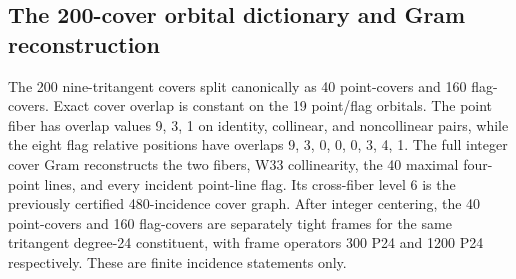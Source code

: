 \subsection{The 200-cover orbital dictionary and Gram reconstruction}
The 200 nine-tritangent covers split canonically as 40 point-covers and 160 flag-covers. Exact cover overlap is constant on the 19 point/flag orbitals. The point fiber has overlap values 9, 3, 1 on identity, collinear, and noncollinear pairs, while the eight flag relative positions have overlaps 9, 3, 0, 0, 0, 3, 4, 1. The full integer cover Gram reconstructs the two fibers, W33 collinearity, the 40 maximal four-point lines, and every incident point-line flag. Its cross-fiber level 6 is the previously certified 480-incidence cover graph. After integer centering, the 40 point-covers and 160 flag-covers are separately tight frames for the same tritangent degree-24 constituent, with frame operators 300 P24 and 1200 P24 respectively. These are finite incidence statements only.
